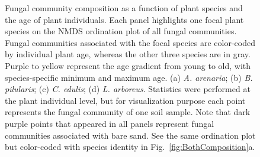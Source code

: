 \newpage
\begin{figure}[h]
	\centering
	\caption[Fungal community composition as a function of plant species and the age of plant individuals.]
		{\hspace{1mm} 
		Fungal community composition as a function of plant species and the age of plant individuals. Each panel highlights one focal plant species on the NMDS ordination plot of all fungal communities. Fungal communities associated with the focal species are color-coded by individual plant age, whereas the other three species are in gray. Purple to yellow represent the age gradient from young to old, with species-specific minimum and maximum age. (a) \textit{A. arenaria}; (b) \textit{B. pilularis}; (c) \textit{C. edulis}; (d) \textit{L. arboreus}. 
		Statistics were performed at the plant individual level, but for visualization purpose each point represents the fungal community of one soil sample. Note that dark purple points that appeared in all panels represent fungal communities associated with bare sand. See the same ordination plot but color-coded with species identity in Fig.~\ref{fig:BothComposition}a.}
	\label{fig:FunComposition}
\end{figure}



